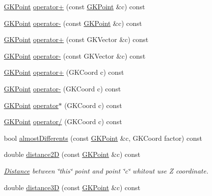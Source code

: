 \begin{DoxyCompactItemize}
\item 
\hyperlink{classGKPoint}{G\+K\+Point} \hyperlink{classGKPoint_a49eb5b7f0a82547ab73381a0681dbda6}{operator+} (const \hyperlink{classGKPoint}{G\+K\+Point} \&c) const 
\item 
\hyperlink{classGKPoint}{G\+K\+Point} \hyperlink{classGKPoint_ada69506f4a28f5677ceb589b760ff2d5}{operator-\/} (const \hyperlink{classGKPoint}{G\+K\+Point} \&c) const 
\item 
\hyperlink{classGKPoint}{G\+K\+Point} \hyperlink{classGKPoint_ae03bb5ff56c91973d4a85f7f2e14379e}{operator+} (const G\+K\+Vector \&c) const 
\item 
\hyperlink{classGKPoint}{G\+K\+Point} \hyperlink{classGKPoint_a820a921c8cd07a9ec15526d7677d0fba}{operator-\/} (const G\+K\+Vector \&c) const 
\item 
\hyperlink{classGKPoint}{G\+K\+Point} \hyperlink{classGKPoint_a1d0cd1f3ed5d44bd88895e82849aa934}{operator+} (G\+K\+Coord c) const 
\item 
\hyperlink{classGKPoint}{G\+K\+Point} \hyperlink{classGKPoint_a709b05770a34025f4bc41bd9cd57b516}{operator-\/} (G\+K\+Coord c) const 
\item 
\hyperlink{classGKPoint}{G\+K\+Point} \hyperlink{classGKPoint_a5503c4a33c7bffbca07aeb74ff2f23dd}{operator$\ast$} (G\+K\+Coord c) const 
\item 
\hyperlink{classGKPoint}{G\+K\+Point} \hyperlink{classGKPoint_afaebd76baf8a9b7902ea77e8f95a6a20}{operator/} (G\+K\+Coord c) const 
\item 
bool \hyperlink{classGKPoint_a597fd195edde7b78a635c1c9dc89336f}{almost\+Differents} (const \hyperlink{classGKPoint}{G\+K\+Point} \&c, G\+K\+Coord factor) const 
\item 
double \hyperlink{classGKPoint_a16745a3828174f2ff7c6034e9fc52a89}{distance2D} (const \hyperlink{classGKPoint}{G\+K\+Point} \&c) const \hypertarget{classGKPoint_a16745a3828174f2ff7c6034e9fc52a89}{}\label{classGKPoint_a16745a3828174f2ff7c6034e9fc52a89}

\begin{DoxyCompactList}\small\item\em \hyperlink{structDistance}{Distance} between \char`\"{}this\char`\"{} point and point \char`\"{}c\char`\"{} whitout use Z coordinate. \end{DoxyCompactList}\item 
double \hyperlink{classGKPoint_a9b006f77d1c21b4790b9e283f614130a}{distance3D} (const \hyperlink{classGKPoint}{G\+K\+Point} \&c) const \hypertarget{classGKPoint_a9b006f77d1c21b4790b9e283f614130a}{}\label{classGKPoint_a9b006f77d1c21b4790b9e283f614130a}


\end{DoxyCompactItemize}
